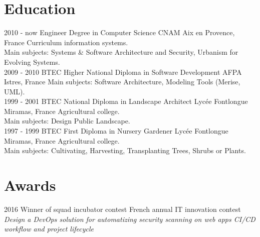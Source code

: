 \documentclass[]{friggeri-cv}
\begin{document}
\section{Education}
\begin{entrylist}
    \entry
        {2010 - now}
        {Engineer Degree in Computer Science}
        {CNAM Aix en Provence, France}
        {Curriculum information systems.\\
        Main subjects: Systems \& Software Architecture and Security,
        Urbanism for Evolving Systems.\\}
    \entry
        {2009 - 2010}
        {BTEC Higher National Diploma in Software Development}
        {AFPA Istres, France}
        {Main subjects: Software Architecture, Modeling Tools (Merise, UML).\\}
    \entry
        {1999 - 2001}
        {BTEC National Diploma in Landscape Architect}
        {Lycée Fontlongue Miramas, France}
        {Agricultural college.\\
        Main subjects: Design Public Landscape.\\}
    \entry
        {1997 - 1999}
        {BTEC First Diploma in Nursery Gardener}
        {Lycée Fontlongue Miramas, France}
        {Agricultural college.\\
        Main subjects: Cultivating, Harvesting, Transplanting Trees, Shrubs or Plants.}
\end{entrylist}

\section{Awards}
\begin{entrylist}
    \entry
        {2016}
        {Winner of squad incubator contest}
        {French annual IT innovation contest}
        {\emph{Design a DevOps solution for automatizing security scanning on
        web apps CI/CD workflow and project lifecycle}}
\end{entrylist}
\end{document}
